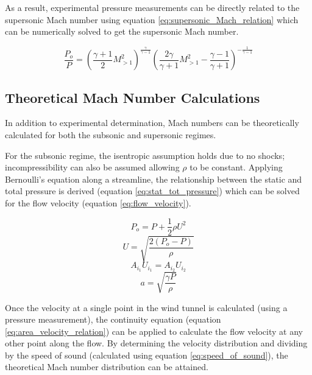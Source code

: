\documentclass[runningheads]{llncs}
\begin{document}
\noindent
As a result, experimental pressure measurements can be directly related to the supersonic Mach number using equation \ref{eq:supersonic_Mach_relation} which can be numerically solved to get the supersonic Mach number.

\begin{equation}
    \frac{P_o}{P} = \left(\frac{\gamma + 1}{2}M_{>1}^2\right)^{\frac{\gamma}{\gamma - 1}}\left(\frac{2\gamma}{\gamma + 1}M_{>1}^2 - \frac{\gamma - 1}{\gamma + 1}\right)^{-\frac{1}{\gamma - 1}}
    \label{eq:supersonic_Mach_relation}
\end{equation}

\subsection{Theoretical Mach Number Calculations}
\label{sec:thy_Mach_calc}

In addition to experimental determination, Mach numbers can be theoretically calculated for both the subsonic and supersonic regimes.\newline

\noindent
For the subsonic regime, the isentropic assumption holds due to no shocks; incompressibility can also be assumed allowing $\rho$ to be constant. Applying Bernoulli's equation along a streamline, the relationship between the static and total pressure is derived (equation \ref{eq:stat_tot_pressure}) which can be solved for the flow velocity (equation \ref{eq:flow_velocity}).

\begin{multicols}{4}
\begin{equation}
    P_o = P + \frac{1}{2}\rho U^2
    \label{eq:stat_tot_pressure}
\end{equation}
\begin{equation}
    U = \sqrt{\frac{2(P_o - P)}{\rho}}
    \label{eq:flow_velocity}
\end{equation}
\begin{equation}
    A_{i_1}U_{i_1} = A_{i_2}U_{i_2}
    \label{eq:area_velocity_relation}
\end{equation}
\begin{equation}
    a = \sqrt{\frac{\gamma P}{\rho}}
    \label{eq:speed_of_sound}
\end{equation}
\end{multicols}

\noindent
Once the velocity at a single point in the wind tunnel is calculated (using a pressure measurement), the continuity equation (equation \ref{eq:area_velocity_relation}) can be applied to calculate the flow velocity at any other point along the flow. By determining the velocity distribution and dividing by the speed of sound (calculated using equation \ref{eq:speed_of_sound}), the theoretical Mach number distribution can be attained.\newline
\end{document}
